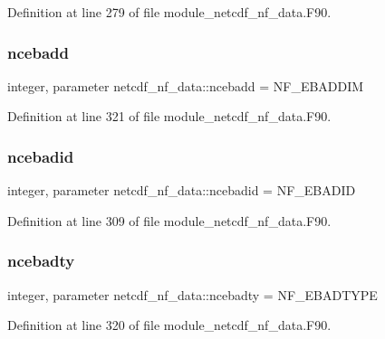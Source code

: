 Definition at line 279 of file module\+\_\+netcdf\+\_\+nf\+\_\+data.\+F90.

\mbox{\label{namespacenetcdf__nf__data_a0ccc9e2af8331c8d0c84d297a83a549e}} 
\subsubsection{\texorpdfstring{ncebadd}{ncebadd}}
{\footnotesize\ttfamily integer, parameter netcdf\+\_\+nf\+\_\+data\+::ncebadd = N\+F\+\_\+\+E\+B\+A\+D\+D\+IM}



Definition at line 321 of file module\+\_\+netcdf\+\_\+nf\+\_\+data.\+F90.

\mbox{\label{namespacenetcdf__nf__data_afca989ca485a79e6842bb7a72cfc639f}} 
\subsubsection{\texorpdfstring{ncebadid}{ncebadid}}
{\footnotesize\ttfamily integer, parameter netcdf\+\_\+nf\+\_\+data\+::ncebadid = N\+F\+\_\+\+E\+B\+A\+D\+ID}



Definition at line 309 of file module\+\_\+netcdf\+\_\+nf\+\_\+data.\+F90.

\mbox{\label{namespacenetcdf__nf__data_a8d54e06d25b56b67e22147d96ed2ac66}} 
\subsubsection{\texorpdfstring{ncebadty}{ncebadty}}
{\footnotesize\ttfamily integer, parameter netcdf\+\_\+nf\+\_\+data\+::ncebadty = N\+F\+\_\+\+E\+B\+A\+D\+T\+Y\+PE}



Definition at line 320 of file module\+\_\+netcdf\+\_\+nf\+\_\+data.\+F90.

